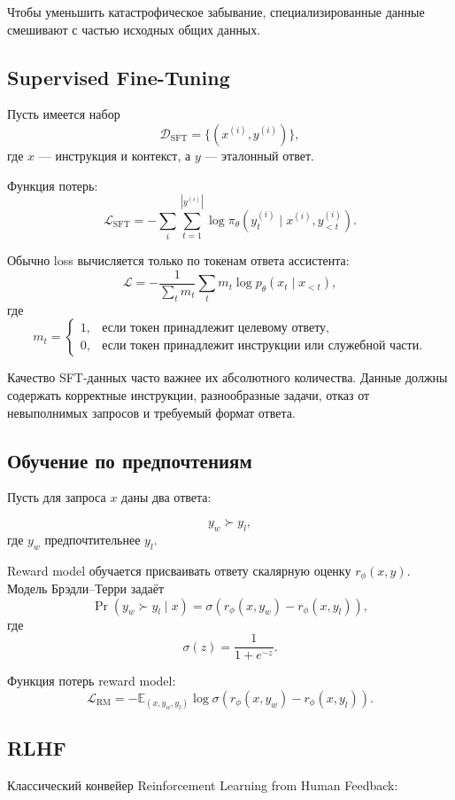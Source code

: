 \documentclass[12pt,a4paper]{article}
\newcommand{\D}{\mathcal{D}}
\newcommand{\E}{\mathbb{E}}
\newcommand{\1}{\mathbf{1}}
\theoremstyle{definition}
\theoremstyle{remark}
\begin{document}
Чтобы уменьшить катастрофическое забывание, специализированные данные
смешивают с частью исходных общих данных.

\subsection{Supervised Fine-Tuning}

Пусть имеется набор
\[
\D_{\mathrm{SFT}}=\{(x^{(i)},y^{(i)})\},
\]
где $x$ --- инструкция и контекст, а $y$ --- эталонный ответ.

Функция потерь:
\[
\mathcal{L}_{\mathrm{SFT}}
=
-\sum_i\sum_{t=1}^{|y^{(i)}|}
\log
\pi_\theta
\left(
y_t^{(i)}
\mid
x^{(i)},y_{<t}^{(i)}
\right).
\]

Обычно loss вычисляется только по токенам ответа ассистента:
\[
\mathcal{L}
=
-\frac{1}{\sum_t m_t}
\sum_t
m_t\log p_\theta(x_t\mid x_{<t}),
\]
где
\[
m_t=
\begin{cases}
1,&\text{если токен принадлежит целевому ответу},\\
0,&\text{если токен принадлежит инструкции или служебной части}.
\end{cases}
\]

Качество SFT-данных часто важнее их абсолютного количества. Данные должны
содержать корректные инструкции, разнообразные задачи, отказ от
невыполнимых запросов и требуемый формат ответа.

\subsection{Обучение по предпочтениям}

Пусть для запроса $x$ даны два ответа:

\[
y_w \succ y_l,
\]
где $y_w$ предпочтительнее $y_l$.

Reward model обучается присваивать ответу скалярную оценку $r_\phi(x,y)$.
Модель Брэдли--Терри задаёт
\[
\Pr(y_w\succ y_l\mid x)
=
\sigma
\left(
r_\phi(x,y_w)-r_\phi(x,y_l)
\right),
\]
где
\[
\sigma(z)=\frac{1}{1+e^{-z}}.
\]

Функция потерь reward model:
\[
\mathcal{L}_{\mathrm{RM}}
=
-\E_{(x,y_w,y_l)}
\log\sigma
\left(
r_\phi(x,y_w)-r_\phi(x,y_l)
\right).
\]

\subsection{RLHF}

Классический конвейер Reinforcement Learning from Human Feedback:
\end{document}
